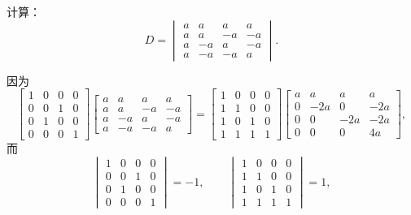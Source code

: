 \begin{example}
计算：\begin{equation*}
	D = \begin{vmatrix}
		a & a & a & a \\
		a & a & -a & -a \\
		a & -a & a & -a \\
		a & -a & -a & a
	\end{vmatrix}.
\end{equation*}
\begin{solution}
因为\begin{equation*}
	\begin{bmatrix}
		1 & 0 & 0 & 0 \\
		0 & 0 & 1 & 0 \\
		0 & 1 & 0 & 0 \\
		0 & 0 & 0 & 1
	\end{bmatrix} \begin{bmatrix}
		a & a & a & a \\
		a & a & -a & -a \\
		a & -a & a & -a \\
		a & -a & -a & a
	\end{bmatrix}
	= \begin{bmatrix}
		1 & 0 & 0 & 0 \\
		1 & 1 & 0 & 0 \\
		1 & 0 & 1 & 0 \\
		1 & 1 & 1 & 1
	\end{bmatrix} \begin{bmatrix}
		a & a & a & a \\
		0 & -2 a & 0 & -2 a \\
		0 & 0 & -2 a & -2 a \\
		0 & 0 & 0 & 4 a
	\end{bmatrix},
\end{equation*}而\begin{equation*}
	\begin{vmatrix}
		1 & 0 & 0 & 0 \\
		0 & 0 & 1 & 0 \\
		0 & 1 & 0 & 0 \\
		0 & 0 & 0 & 1
	\end{vmatrix} = -1,
	\qquad
	\begin{vmatrix}
		1 & 0 & 0 & 0 \\
		1 & 1 & 0 & 0 \\
		1 & 0 & 1 & 0 \\
		1 & 1 & 1 & 1
	\end{vmatrix} = 1,
\end{equation*}\begin{equation*}

\end{equation*}
\end{solution}
\end{example}
